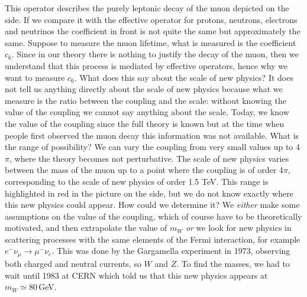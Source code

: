\documentclass[../main.tex]{subfiles}
\begin{document}
\begin{example}
This operator describes the purely leptonic decay of the muon depicted on the side. If we compare it with the effective operator for protons, neutrons, electrons and neutrinos the coefficient in front is not quite the same but approximately the same. Suppose to measure the muon lifetime, what is measured is the coefficient $c_6$. Since in our theory there is nothing to justify the decay of the muon, then we understand that this process is mediated by effective operators, hence why we want to measure $c_6$. What does this say about the scale of new physics? It does not tell us anything directly about the scale of new physics because what we measure is the ratio between the coupling and the scale: without knowing the value of the coupling we cannot say anything about the scale. Today, we know the value of the coupling since the full theory is known but at the time when people first observed the muon decay this information was not available. What is the range of possibility? We can vary the coupling from very small values up to 4$\pi$, where the theory becomes not perturbative.  The scale of new physics varies between the mass of the muon up to a point where the coupling is of order 4$\pi$, corresponding to the scale of new physics of order 1.5 TeV. This range is highlighted in red in the picture on the side, but we do not know exactly where this new physics could appear. How could we determine it? We \textit{either} make some assumptions on the value of the coupling, which of course have to be theoretically motivated, and then extrapolate the value of $m_W$ \textit{or} we look for new physics in scattering processes with the same elements of the Fermi interaction, for example $e^-\nu_\mu\to\mu^-\nu_e$. This was done by the Gargamella experiment in 1973, observing both charged and neutral currents, so $W$ and $Z$. To find the masses, we had to wait until 1983 at CERN which told us that this new physics appears at $m_W\simeq80$\,GeV.
\end{example} 
\end{document}
